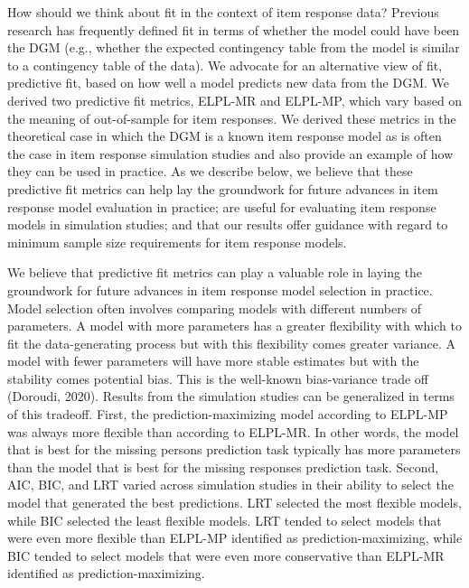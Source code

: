 \documentclass[
  english,
  man,floatsintext]{apa7}
\begin{document}
How should we think about fit in the context of item response data? Previous research has frequently defined fit in terms of whether the model could have been the DGM (e.g., whether the expected contingency table from the model is similar to a contingency table of the data). We advocate for an alternative view of fit, predictive fit, based on how well a model predicts new data from the DGM. We derived two predictive fit metrics, ELPL-MR and ELPL-MP, which vary based on the meaning of out-of-sample for item responses. We derived these metrics in the theoretical case in which the DGM is a known item response model as is often the case in item response simulation studies and also provide an example of how they can be used in practice. As we describe below, we believe that these predictive fit metrics can help lay the groundwork for future advances in item response model evaluation in practice; are useful for evaluating item response models in simulation studies; and that our results offer guidance with regard to minimum sample size requirements for item response models.

We believe that predictive fit metrics can play a valuable role in laying the groundwork for future advances in item response model selection in practice. Model selection often involves comparing models with different numbers of parameters. A model with more parameters has a greater flexibility with which to fit the data-generating process but with this flexibility comes greater variance. A model with fewer parameters will have more stable estimates but with the stability comes potential bias. This is the well-known bias-variance trade off (Doroudi, 2020). Results from the simulation studies can be generalized in terms of this tradeoff. First, the prediction-maximizing model according to ELPL-MP was always more flexible than according to ELPL-MR. In other words, the model that is best for the missing persons prediction task typically has more parameters than the model that is best for the missing responses prediction task. Second, AIC, BIC, and LRT varied across simulation studies in their ability to select the model that generated the best predictions. LRT selected the most flexible models, while BIC selected the least flexible models. LRT tended to select models that were even more flexible than ELPL-MP identified as prediction-maximizing, while BIC tended to select models that were even more conservative than ELPL-MR identified as prediction-maximizing.
\end{document}
